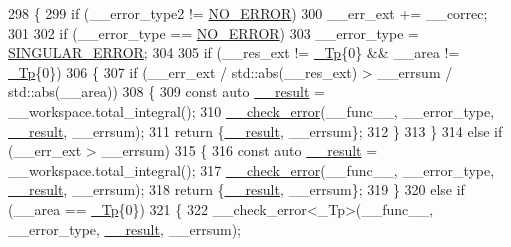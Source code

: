 \begin{DoxyCode}
298         \{
299           \textcolor{keywordflow}{if} (\_\_error\_type2 != \hyperlink{namespace____gnu__cxx_ad6c62dd86a596716cece6ac2d4cfd4b3ac31eecc280b10dec2efb4a2216ccc2e0}{NO\_ERROR})
300             \_\_err\_ext += \_\_correc;
301 
302           \textcolor{keywordflow}{if} (\_\_error\_type == \hyperlink{namespace____gnu__cxx_ad6c62dd86a596716cece6ac2d4cfd4b3ac31eecc280b10dec2efb4a2216ccc2e0}{NO\_ERROR})
303             \_\_error\_type = \hyperlink{namespace____gnu__cxx_ad6c62dd86a596716cece6ac2d4cfd4b3a8e955ea89d59c116d92f16f345620d04}{SINGULAR\_ERROR};
304 
305           \textcolor{keywordflow}{if} (\_\_res\_ext != \hyperlink{namespace____gnu__cxx_a3b19a9c800ca194374ef9172290f7d79}{\_Tp}\{0\} && \_\_area != \hyperlink{namespace____gnu__cxx_a3b19a9c800ca194374ef9172290f7d79}{\_Tp}\{0\})
306             \{
307               \textcolor{keywordflow}{if} (\_\_err\_ext / std::abs(\_\_res\_ext) > \_\_errsum / std::abs(\_\_area))
308                 \{
309                   \textcolor{keyword}{const} \textcolor{keyword}{auto} \hyperlink{namespace____gnu__cxx_a500ea9f53aeaecd8c2ae657503450578}{\_\_result} = \_\_workspace.total\_integral();
310                   \hyperlink{namespace____gnu__cxx_a370fd142548c2e9e39e69282b4603317}{\_\_check\_error}(\_\_func\_\_, \_\_error\_type, \hyperlink{namespace____gnu__cxx_a500ea9f53aeaecd8c2ae657503450578}{\_\_result}, \_\_errsum);
311                   \textcolor{keywordflow}{return} \{\hyperlink{namespace____gnu__cxx_a500ea9f53aeaecd8c2ae657503450578}{\_\_result}, \_\_errsum\};
312                 \}
313             \}
314           \textcolor{keywordflow}{else} \textcolor{keywordflow}{if} (\_\_err\_ext > \_\_errsum)
315             \{
316               \textcolor{keyword}{const} \textcolor{keyword}{auto} \hyperlink{namespace____gnu__cxx_a500ea9f53aeaecd8c2ae657503450578}{\_\_result} = \_\_workspace.total\_integral();
317               \hyperlink{namespace____gnu__cxx_a370fd142548c2e9e39e69282b4603317}{\_\_check\_error}(\_\_func\_\_, \_\_error\_type, \hyperlink{namespace____gnu__cxx_a500ea9f53aeaecd8c2ae657503450578}{\_\_result}, \_\_errsum);
318               \textcolor{keywordflow}{return} \{\hyperlink{namespace____gnu__cxx_a500ea9f53aeaecd8c2ae657503450578}{\_\_result}, \_\_errsum\};
319             \}
320           \textcolor{keywordflow}{else} \textcolor{keywordflow}{if} (\_\_area == \hyperlink{namespace____gnu__cxx_a3b19a9c800ca194374ef9172290f7d79}{\_Tp}\{0\})
321             \{
322               \_\_check\_error<\_Tp>(\_\_func\_\_, \_\_error\_type, \hyperlink{namespace____gnu__cxx_a500ea9f53aeaecd8c2ae657503450578}{\_\_result}, \_\_errsum);

\end{DoxyCode}
